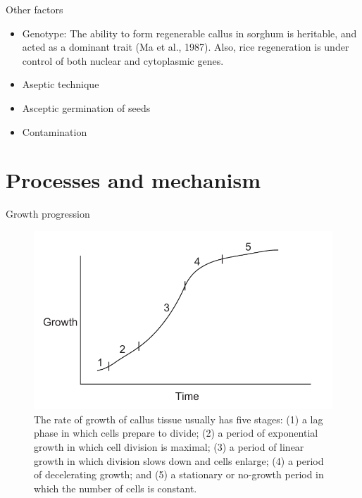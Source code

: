 \documentclass[
  ignorenonframetext,
  aspectratio=169]{beamer}
\providecommand{\tightlist}{%
  \setlength{\itemsep}{0pt}\setlength{\parskip}{0pt}}
\begin{document}
\begin{frame}{Other factors}
\protect\hypertarget{other-factors}{}
\begin{itemize}
\tightlist
\item
  Genotype: The ability to form regenerable callus in sorghum is
  heritable, and acted as a dominant trait (Ma et al., 1987). Also, rice
  regeneration is under control of both nuclear and cytoplasmic genes.
\item
  Aseptic technique
\item
  Asceptic germination of seeds
\item
  Contamination
\end{itemize}
\end{frame}

\hypertarget{processes-and-mechanism}{%
\section{Processes and mechanism}\label{processes-and-mechanism}}

\begin{frame}{Growth progression}
\protect\hypertarget{growth-progression}{}
\begin{figure}
\includegraphics[width=0.4\linewidth]{../images/growth_curve} \caption{The rate of growth of callus tissue usually has five stages: (1) a lag phase in which cells prepare to divide; (2) a period of exponential growth in which cell division is maximal; (3) a period of linear growth in which division slows down and cells enlarge; (4) a period of decelerating growth; and (5) a stationary or no-growth period in which the number of cells is constant.}\label{fig:growth-curves}
\end{figure}
\end{frame}
\end{document}

